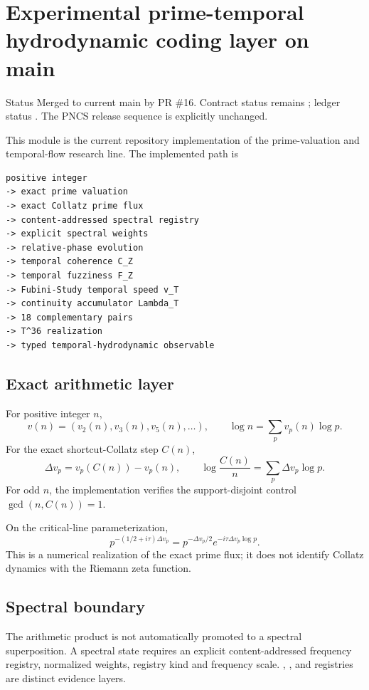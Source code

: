 \chapter{Experimental prime-temporal hydrodynamic coding layer on main}

\begin{statusbox}{Status}
Merged to current main by PR \#16. Contract status remains ; ledger status . The PNCS release sequence is explicitly unchanged.
\end{statusbox}

This module is the current repository implementation of the prime-valuation and temporal-flow research line. The implemented path is
\begin{lstlisting}
positive integer
-> exact prime valuation
-> exact Collatz prime flux
-> content-addressed spectral registry
-> explicit spectral weights
-> relative-phase evolution
-> temporal coherence C_Z
-> temporal fuzziness F_Z
-> Fubini-Study temporal speed v_T
-> continuity accumulator Lambda_T
-> 18 complementary pairs
-> T^36 realization
-> typed temporal-hydrodynamic observable
\end{lstlisting}

\section{Exact arithmetic layer}
For positive integer \(n\),
\[
v(n)=(v_2(n),v_3(n),v_5(n),\ldots),
\qquad
\log n=\sum_p v_p(n)\log p.
\]
For the exact shortcut-Collatz step \(C(n)\),
\[
\Delta v_p=v_p(C(n))-v_p(n),
\qquad
\boxed{\log\frac{C(n)}n=\sum_p\Delta v_p\log p.}
\]
For odd \(n\), the implementation verifies the support-disjoint control \(\gcd(n,C(n))=1\).

On the critical-line parameterization,
\[
p^{-(1/2+i\tau)\Delta v_p}=p^{-\Delta v_p/2}e^{-i\tau\Delta v_p\log p}.
\]
This is a numerical realization of the exact prime flux; it does not identify Collatz dynamics with the Riemann zeta function.

\section{Spectral boundary}
The arithmetic product is not automatically promoted to a spectral superposition. A spectral state requires an explicit content-addressed frequency registry, normalized weights, registry kind and frequency scale. , , and  registries are distinct evidence layers.

